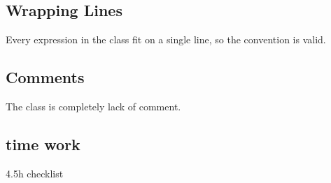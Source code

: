 \documentclass{article}
\begin{document}
\subsection{Wrapping Lines}
Every expression in the class fit on a single line, so the convention is valid.
\subsection{Comments}
The class is completely lack of comment.

\subsection{time work}
4.5h checklist
\end{document}
